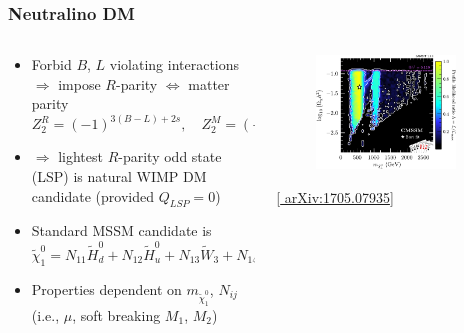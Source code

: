 \documentclass[10pt,aspectratio=169]{beamer}
\begin{document}
\begin{frame}
  \frametitle{Neutralino DM}
  \begin{columns}[t]
    \begin{column}{0.5\textwidth}
      \begin{itemize} \itemsep1em
      \item Forbid $B$, $L$ violating interactions $\Rightarrow$
        impose {\color{blue} $R$-parity $\Leftrightarrow$
        matter parity}
        \begin{equation*}
          Z_2^R = (-1)^{3(B - L) + 2 s} , \quad
          Z_2^M = (-1)^{3 (B - L)}
        \end{equation*}
      \item $\Rightarrow$ lightest $R$-parity odd state (LSP) is
        {\color{blue} natural WIMP DM candidate} (provided $Q_{LSP} = 0$)
      \item Standard MSSM candidate is
        \begin{equation*}
          \tilde{\chi}_1^0 = N_{11} \tilde{H}_d^0 + N_{12} \tilde{H}_u^0
          + N_{13} \tilde{W}_3 + N_{14} \tilde{B}
        \end{equation*}
      \item Properties dependent on $m_{\tilde{\chi}_1^0}$, $N_{ij}$
        (i.e., $\mu$, soft breaking $M_1$, $M_2$)
      \end{itemize}
    \end{column}
    \begin{column}{0.5\textwidth}
      \begin{figure}
        \centering
        \includegraphics[width=0.9\textwidth]{gambit_gut_direct_detection}
      \end{figure}
      \vspace*{-20pt}
      \begin{center}
        { \tiny [\href{http://arxiv.org/abs/1705.07935}{%
              arXiv:1705.07935}] }
      \end{center}
    \end{column}
  \end{columns}
\end{frame}
\end{document}
